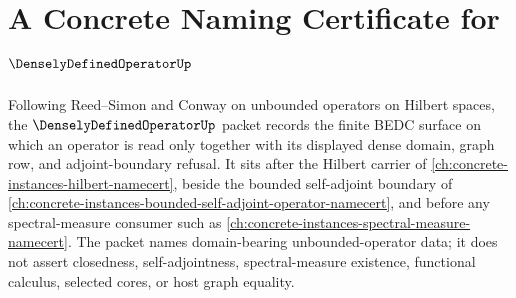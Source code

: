 \chapter{A Concrete Naming Certificate for $\DenselyDefinedOperatorUp$}
\label{ch:concrete-instances-densely-defined-operator-namecert}

Following Reed--Simon and Conway on unbounded operators on Hilbert spaces, the $\DenselyDefinedOperatorUp$ packet records the finite BEDC surface on which an operator is read only together with its displayed dense domain, graph row, and adjoint-boundary refusal. It sits after the Hilbert carrier of \autoref{ch:concrete-instances-hilbert-namecert}, beside the bounded self-adjoint boundary of \autoref{ch:concrete-instances-bounded-self-adjoint-operator-namecert}, and before any spectral-measure consumer such as \autoref{ch:concrete-instances-spectral-measure-namecert}. The packet names domain-bearing unbounded-operator data; it does not assert closedness, self-adjointness, spectral-measure existence, functional calculus, selected cores, or host graph equality.

